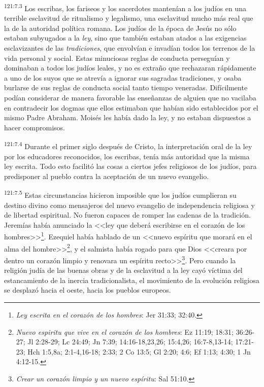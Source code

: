 \par 
\textsuperscript{121:7.3} Los escribas, los fariseos y los sacerdotes mantenían a los judíos en una terrible esclavitud de ritualismo y legalismo, una esclavitud mucho más real que la de la autoridad política romana. Los judíos de la época de Jesús no sólo estaban subyugados a la \textit{ley}, sino que también estaban atados a las exigencias esclavizantes de las \textit{tradiciones}, que envolvían e invadían todos los terrenos de la vida personal y social. Estas minuciosas reglas de conducta perseguían y dominaban a todos los judíos leales, y no es extraño que rechazaran rápidamente a uno de los suyos que se atrevía a ignorar sus sagradas tradiciones, y osaba burlarse de sus reglas de conducta social tanto tiempo veneradas. Difícilmente podían considerar de manera favorable las enseñanzas de alguien que no vacilaba en contradecir los dogmas que ellos estimaban que habían sido establecidos por el mismo Padre Abraham. Moisés les había dado la ley, y no estaban dispuestos a hacer compromisos.

\par 
\textsuperscript{121:7.4} Durante el primer siglo después de Cristo, la interpretación oral de la ley por los educadores reconocidos, los escribas, tenía más autoridad que la misma ley escrita. Todo esto facilitó las cosas a ciertos jefes religiosos de los judíos, para predisponer al pueblo contra la aceptación de un nuevo evangelio.

\par 
\textsuperscript{121:7.5} Estas circunstancias hicieron imposible que los judíos cumplieran su destino divino como mensajeros del nuevo evangelio de independencia religiosa y de libertad espiritual. No fueron capaces de romper las cadenas de la tradición. Jeremías había anunciado la <<ley que deberá escribirse en el corazón de los hombres>>\footnote{\textit{Ley escrita en el corazón de los hombres}: Jer 31:33; 32:40.}. Ezequiel había hablado de un <<nuevo espíritu que morará en el alma del hombre>>\footnote{\textit{Nuevo espiritu que vive en el corazón de los hombres}: Ez 11:19; 18:31; 36:26-27; Jl 2:28-29; Lc 24:49; Jn 7:39; 14:16-18,23,26; 15:4,26; 16:7-8,13-14; 17:21-23; Hch 1:5,8a; 2:1-4,16-18; 2:33; 2 Co 13:5; Gl 2:20; 4:6; Ef 1:13; 4:30; 1 Jn 4:12-15.}, y el salmista había rogado para que Dios <<creara por dentro un corazón limpio y renovara un espíritu recto>>\footnote{\textit{Crear un corazón limpio y un nuevo espíritu}: Sal 51:10.}. Pero cuando la religión judía de las buenas obras y de la esclavitud a la ley cayó víctima del estancamiento de la inercia tradicionalista, el movimiento de la evolución religiosa se desplazó hacia el oeste, hacia los pueblos europeos.

